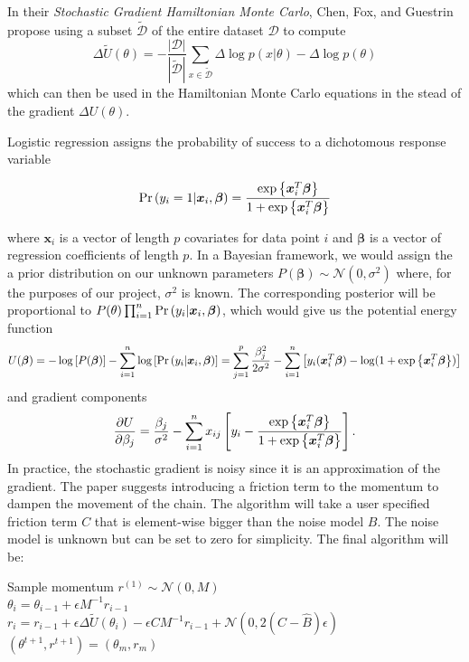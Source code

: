 In their \textit{Stochastic Gradient Hamiltonian Monte Carlo}, Chen, Fox, and Guestrin propose using a subset $\tilde{\mathcal{D}}$ of the entire dataset $\mathcal{D}$ to compute
\begin{equation*}
	\Delta\tilde{U}(\theta)=-\frac{|\mathcal{D}|}{|\tilde{\mathcal{D}}|}\sum_{x\in\tilde{\mathcal{D}}}\Delta\log p(x|\theta) - \Delta\log p(\theta)
\end{equation*}
which can then be used in the Hamiltonian Monte Carlo equations in the stead of the gradient $\Delta U(\theta)$.

Logistic regression assigns the probability of success to a dichotomous response variable

\begin{equation*}
	\mathrm{Pr}\left(y_i=1|\bm{x}_{i},\bm{\beta}\right)=\frac{\exp\left\lbrace\bm{x}_i^T\bm{\beta} \right\rbrace}{1+\exp\left\lbrace\bm{x}_i^T\bm{\beta} \right\rbrace}
\end{equation*}

where $\bm{x}_i$ is a vector of length $p$ covariates for data point $i$ and $\bm{\beta}$ is a vector of regression coefficients of length $p$. In a Bayesian framework, we would assign the a prior distribution on our unknown parameters $P(\bm{\beta})\sim\mathcal{N}(0, \sigma^2)$ where, for the purposes of our project, $\sigma^2$ is known. The corresponding posterior will be proportional to $P(\theta)\prod_{i=1}^n\mathrm{Pr}\left(y_i|\bm{x}_i,\bm{\beta}\right)$, which would give us the potential energy function
\begin{equation*}
U(\bm{\beta})=-\log\left[P(\bm{\beta})\right] - \sum_{i=1}^n\log\left[\mathrm{Pr}\left(y_i|\bm{x}_i,\bm{\beta}\right)\right]=\sum_{j=1}^p\frac{\beta_j^2}{2\sigma^2}-\sum_{i=1}^n\left[y_i(\bm{x}_i^T\bm{\beta})-\log(1+\exp\left\lbrace\bm{x}_i^T\bm{\beta} \right\rbrace)\right]
\end{equation*}
and gradient components
\begin{equation*}
\frac{\partial U}{\partial \beta_j}=\frac{\beta_j}{\sigma^2}-\sum_{i=1}^{n}x_{ij}\left[y_i-\frac{\exp\left\lbrace\bm{x}_i^T\bm{\beta} \right\rbrace}{1+\exp\left\lbrace\bm{x}_i^T\bm{\beta} \right\rbrace}\right]. 
\end{equation*}
In practice, the stochastic gradient is noisy since it is an approximation of the gradient. The paper suggests introducing a friction term to the momentum to dampen the movement of the chain. The algorithm will take a user specified friction term $C$ that is element-wise bigger than the noise model $B$. The noise model is unknown but can be set to zero for simplicity. The final algorithm will be:

\begin{algorithm}[H]
	 {
		Sample momentum $r^{(1)}\sim\mathcal{N}(0, M)$\\
		 {
			$\theta_i=\theta_{i-1}+\epsilon M^{-1}r_{i-1}$\\
			$r_i = r_{i-1} + \epsilon \Delta\tilde{U}(\theta_i)-\epsilon C M^{-1}r_{i-1}+\mathcal{N}(0, 2(C-\hat{B})\epsilon)$\\
		}
		$(\theta^{t+1}, r^{t+1})=(\theta_m, r_m)$\\
	}
\end{algorithm}

